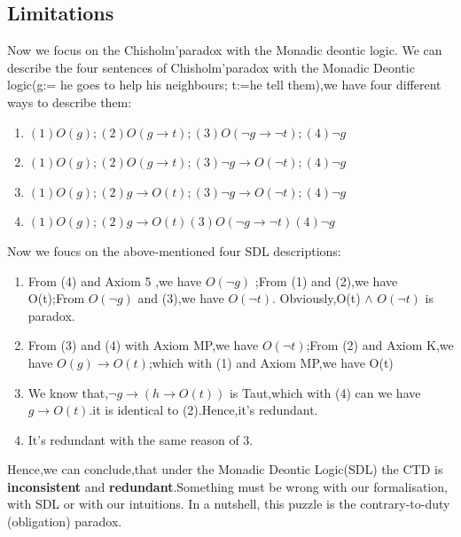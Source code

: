 \documentclass{article}
\begin{document}
\subsection{Limitations}
Now we focus on the Chisholm'paradox with the Monadic deontic logic.
We can describe the four sentences of Chisholm'paradox with the Monadic Deontic logic(g:= he goes to help his neighbours; t:=he tell them),we have four different ways to describe them:
\begin{enumerate}
\item $(1)O(g);(2)O(g\to t);(3)O(\neg g\to \neg t);(4) \neg g$
\item $(1)O(g);(2)O(g \to t);(3) \neg g \to O (\neg t); (4) \neg g$
\item $(1)O(g);(2)g\to O(t);(3)\neg g \to O(\neg t) ;(4)\neg g $
\item $ (1)O(g);(2)g\to O(t)(3)O(\neg g\to \neg t)(4)\neg g$
\end{enumerate}
Now we foucs on the above-mentioned four SDL descriptions:
\begin{enumerate}
\item From (4) and Axiom 5 ,we have $O(\neg g) $ ;From (1) and (2),we have O(t);From $O(\neg g)$ and (3),we have $ O(\neg t)$. Obviously,O(t) $\wedge$ $O(\neg t)$ is paradox.
\item From (3) and (4) with Axiom MP,we have $O(\neg t)$;From (2) and Axiom K,we have $O(g)\to O(t) $;which with (1) and Axiom MP,we have O(t)
\item We know that,$ \neg g \to (h \to O(t))$ is Taut,which with (4) can we have $ g \to O(t)$.it is identical to (2).Hence,it's redundant.
\item It's redundant with the same reason of 3.
\end{enumerate}
Hence,we can conclude,that under the Monadic Deontic Logic(SDL) the CTD is
\textbf{inconsistent} and \textbf{redundant}.Something must be wrong with our formalisation, with SDL or with our intuitions. In a nutshell, this puzzle is the contrary-to-duty
(obligation) paradox.\\
\end{document}

